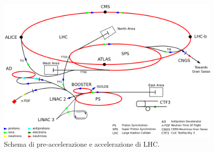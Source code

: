 \begin{figure}
\centering
\includegraphics[scale=0.25]{Immagini/LHC}
\caption{Schema di pre-accelerazione e accelerazione di LHC.}
\label{fig:LHC}
\end{figure}

